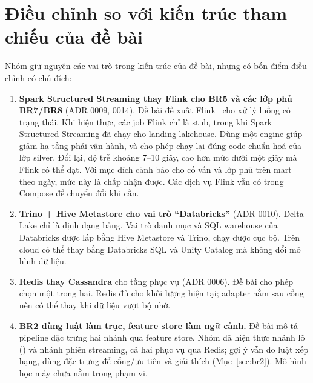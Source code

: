 \section{Điều chỉnh so với kiến trúc tham chiếu của đề bài}
\label{sec:deviations}

Nhóm giữ nguyên các vai trò trong kiến trúc của đề bài, nhưng có bốn điểm điều chỉnh có chủ đích:

\begin{enumerate}
  \item \textbf{Spark Structured Streaming thay Flink cho BR5 và các lớp phủ BR7/BR8} (ADR 0009, 0014). Đề bài đề xuất Flink~\cite{carbone2015flink} cho xử lý luồng có trạng thái. Khi hiện thực, các job Flink chỉ là stub, trong khi Spark Structured Streaming đã chạy cho landing lakehouse. Dùng một engine giúp giảm hạ tầng phải vận hành, và cho phép chạy lại đúng code chuẩn hoá của lớp silver. Đổi lại, độ trễ khoảng 7--10 giây, cao hơn mức dưới một giây mà Flink có thể đạt. Với mục đích cảnh báo cho cố vấn và lớp phủ trên mart theo ngày, mức này là chấp nhận được. Các dịch vụ Flink vẫn có trong Compose để chuyển đổi khi cần.
  \item \textbf{Trino + Hive Metastore cho vai trò ``Databricks''} (ADR 0010). Delta Lake chỉ là định dạng bảng. Vai trò danh mục và SQL warehouse của Databricks được lấp bằng Hive Metastore và Trino, chạy được cục bộ. Trên cloud có thể thay bằng Databricks SQL và Unity Catalog mà không đổi mô hình dữ liệu.
  \item \textbf{Redis thay Cassandra} cho tầng phục vụ (ADR 0006). Đề bài cho phép chọn một trong hai. Redis đủ cho khối lượng hiện tại; adapter nằm sau cổng nên có thể thay khi dữ liệu vượt bộ nhớ.
  \item \textbf{BR2 dùng luật làm trục, feature store làm ngữ cảnh.} Đề bài mô tả pipeline đặc trưng hai nhánh qua feature store. Nhóm đã hiện thực nhánh lô () và nhánh phiên streaming, cả hai phục vụ qua Redis; gợi ý vẫn do luật xếp hạng, dùng đặc trưng để cổng/ưu tiên và giải thích (Mục~\ref{sec:br2}). Mô hình học máy chưa nằm trong phạm vi.
\end{enumerate}
